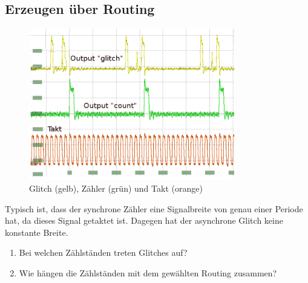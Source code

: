 \subsection{Erzeugen über Routing} 
\begin{figure}[H]
	\centering
	\includegraphics[width=0.8\textwidth]{images/glitch/Glitch_2_good_kommentar.png}
	\caption{Glitch (gelb), Zähler (grün) und Takt (orange)}
	\label{fig.glitch.result_1}
\end{figure}

Typisch ist, dass der synchrone Zähler eine Signalbreite von genau einer Periode hat, da dieses Signal getaktet ist. Dagegen hat der asynchrone Glitch keine konstante Breite.
\begin{enumerate}
	\item{Bei welchen Zählständen treten Glitches auf?}

	\item{Wie hängen die Zählständen mit dem gewählten Routing zusammen?}

\end{enumerate}
